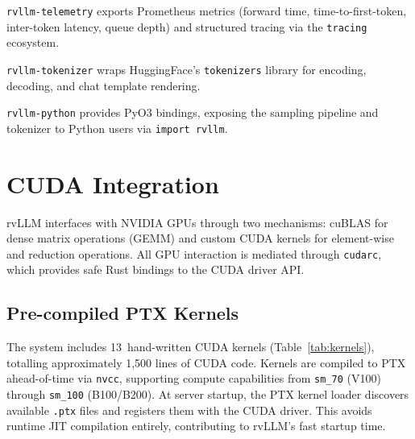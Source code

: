 \documentclass[11pt,a4paper]{article}
\begin{document}
\texttt{rvllm-telemetry} exports Prometheus metrics (forward time, time-to-first-token,
inter-token latency, queue depth) and structured tracing via the \texttt{tracing}
ecosystem.

\texttt{rvllm-tokenizer} wraps HuggingFace's \texttt{tokenizers}
library for encoding, decoding, and chat template rendering.

\texttt{rvllm-python} provides PyO3 bindings, exposing the sampling pipeline and
tokenizer to Python users via \texttt{import rvllm}.

\section{CUDA Integration}
\label{sec:cuda}

rvLLM interfaces with NVIDIA GPUs through two mechanisms: cuBLAS for dense
matrix operations (GEMM) and custom CUDA kernels for element-wise and reduction
operations. All GPU interaction is mediated through \texttt{cudarc}, which provides
safe Rust bindings to the CUDA driver API.

\subsection{Pre-compiled PTX Kernels}

The system includes 13~hand-written CUDA kernels (Table~\ref{tab:kernels}),
totalling approximately 1,500 lines of CUDA code. Kernels are compiled to PTX
ahead-of-time via \texttt{nvcc}, supporting compute capabilities from \texttt{sm\_70}
(V100) through \texttt{sm\_100} (B100/B200). At server startup, the PTX kernel loader
discovers available \texttt{.ptx} files and registers them with the CUDA driver. This
avoids runtime JIT compilation entirely, contributing to rvLLM's fast startup time.
\end{document}
